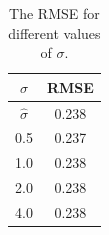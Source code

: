 
\begin{table}[H]
    \label{tbl:rmse_values_for_different_sigmas}
    \centering

    \begin{tabular}{c|c}
        \hline
        $\sigma$ & RMSE \\
        \hline
        
        $\hat{\sigma}$ & 0.238 \\
        0.5 & 0.237 \\
        1.0 & 0.238 \\
        2.0 & 0.238 \\
        4.0 & 0.238 \\

    \end{tabular}

    \caption{The RMSE for different values of $\sigma$.}
\end{table}
